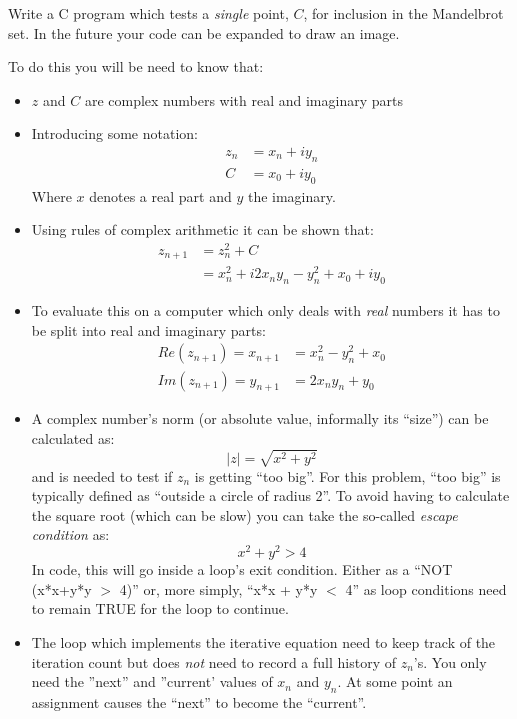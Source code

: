 \documentclass{lab}
\begin{document}
\begin{task}{}{} Write a C program which tests a \textit{single} point, $C$, for inclusion in the Mandelbrot set. In the future your code can be expanded to draw an image.
\end{task}

To do this you will be need to know that:
\begin{itemize}[itemsep=0mm]
\item $z$ and $C$ are complex numbers with real and imaginary parts

\item Introducing some notation:
\begin{align}
z_n &= x_n + iy_n \\
C &= x_0 + iy_0
\end{align}
Where $x$ denotes a real part and $y$ the imaginary.
\item Using rules of complex arithmetic it can be shown that:
\begin{align}
z_{n+1} &= z^2_{n} + C \\
&= x^2_n + i2x_ny_n - y^2_n + x_0 + iy_0
\end{align}
\item To evaluate this on a computer which only deals with \textit{real} numbers it has to be split into real and imaginary parts:
\begin{align}
Re(z_{n+1}) = x_{n+1} &= x^2_n - y^2_n + x_0\\
Im(z_{n+1}) = y_{n+1} &= 2x_ny_n + y_0
\end{align}
\item A complex number's norm (or absolute value, informally its ``size'') can be calculated as:
\begin{equation}
\left|z\right| = \sqrt{x^2 + y^2}
\end{equation}
and is needed to test if $z_n$ is getting ``too big''. For this problem, ``too big'' is typically defined as ``outside a circle of radius 2''. To avoid having to calculate the square root (which can be slow) you can take the so-called \textit{escape condition} as:
\begin{equation}
x^2 + y^2 > 4
\end{equation}
In code, this will go inside a loop's exit condition. Either as a ``NOT (x*x+y*y $>$ 4)'' or, more simply, ``x*x + y*y $<$ 4'' as loop conditions need to remain TRUE for the loop to continue.
\item The loop which implements the iterative equation need to keep track of the iteration count but does \textit{not} need to record a full history of $z_n$'s. You only need the ''next'' and ''current' values of $x_n$ and $y_n$. At some point an assignment causes the ``next'' to become the ``current''.

\end{itemize}
\end{document}
